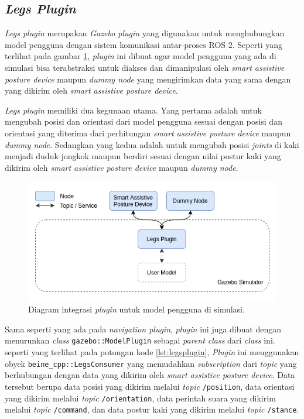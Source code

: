 \subsection{\emph{Legs Plugin}}
\label{subsec:legsplugin}

\emph{Legs plugin} merupakan \emph{Gazebo plugin} yang digunakan untuk menghubungkan model pengguna dengan sistem komunikasi antar-proses ROS 2.
Seperti yang terlihat pada gambar \ref{fig:integrasipluginpengguna},
  \emph{plugin} ini dibuat agar model pengguna yang ada di simulasi bisa terabstraksi untuk diakses dan dimanipulasi oleh \emph{smart assistive posture device} maupun \emph{dummy node} yang mengirimkan data yang sama dengan yang dikirim oleh \emph{smart assistive posture device}.

\emph{Legs plugin} memiliki dua kegunaan utama.
Yang pertama adalah untuk mengubah posisi dan orientasi dari model pengguna sesuai dengan posisi dan orientasi yang diterima dari perhitungan \emph{smart assistive posture device} maupun \emph{dummy node}.
Sedangkan yang kedua adalah untuk mengubah posisi \emph{joints} di kaki menjadi duduk jongkok maupun berdiri sesuai dengan nilai postur kaki yang dikirim oleh \emph{smart assistive posture device} maupun \emph{dummy node}.

\begin{figure}[ht]
  \centering
  \includegraphics[scale=0.5]{gambar/integrasi-plugin-pengguna.png}
  \caption{Diagram integrasi \emph{plugin} untuk model pengguna di simulasi.}
  \label{fig:integrasipluginpengguna}
\end{figure}



Sama seperti yang ada pada \emph{navigation plugin},
  \emph{plugin} ini juga dibuat dengan menurunkan \emph{class} \lstinline{gazebo::ModelPlugin} sebagai \emph{parent class} dari \emph{class} ini.
seperti yang terlihat pada potongan kode \ref{lst:legsplugin},
  \emph{Plugin} ini menggunakan obyek \lstinline{beine_cpp::LegsConsumer} yang memudahkan \emph{subscription} dari \emph{topic} yang berhubungan dengan data yang dikirim oleh \emph{smart assistive posture device}.
Data tersebut berupa data posisi yang dikirim melalui \emph{topic} \lstinline{/position},
  data orientasi yang dikirim melalui \emph{topic} \lstinline{/orientation},
  data perintah suara yang dikirim melalui \emph{topic} \lstinline{/command},
  dan data postur kaki yang dikirim melalui \emph{topic} \lstinline{/stance}.

